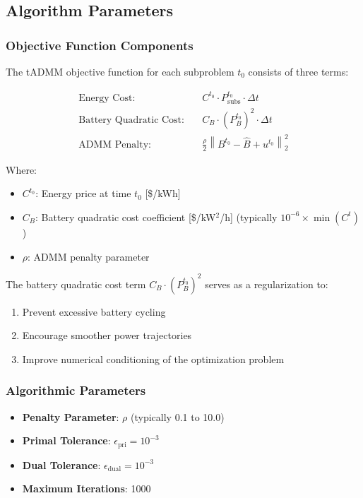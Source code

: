 \subsection{Algorithm Parameters}

\subsubsection{Objective Function Components}

The tADMM objective function for each subproblem $t_0$ consists of three terms:

\begin{align}
\text{Energy Cost:} \quad & C^{t_0} \cdot P_{\text{subs}}^{t_0} \cdot \Delta t \\
\text{Battery Quadratic Cost:} \quad & C_B \cdot \left(P_{B}^{t_0}\right)^2 \cdot \Delta t \\
\text{ADMM Penalty:} \quad & \frac{\rho}{2} \left\| B^{t_0} - \hat{B} + u^{t_0} \right\|_2^2
\end{align}

Where:
\begin{itemize}
    \item $C^{t_0}$: Energy price at time $t_0$ [\$/kWh]
    \item $C_B$: Battery quadratic cost coefficient [\$/kW$^2$/h] (typically $10^{-6} \times \min(C^t)$)
    \item $\rho$: ADMM penalty parameter
\end{itemize}

The battery quadratic cost term $C_B \cdot \left(P_{B}^{t_0}\right)^2$ serves as a regularization to:
\begin{enumerate}
    \item Prevent excessive battery cycling
    \item Encourage smoother power trajectories
    \item Improve numerical conditioning of the optimization problem
\end{enumerate}

\subsubsection{Algorithmic Parameters}

\begin{itemize}
    \item \textbf{Penalty Parameter}: $\rho$ (typically 0.1 to 10.0)
    \item \textbf{Primal Tolerance}: $\epsilon_{\text{pri}} = 10^{-3}$
    \item \textbf{Dual Tolerance}: $\epsilon_{\text{dual}} = 10^{-3}$
    \item \textbf{Maximum Iterations}: 1000
\end{itemize}

